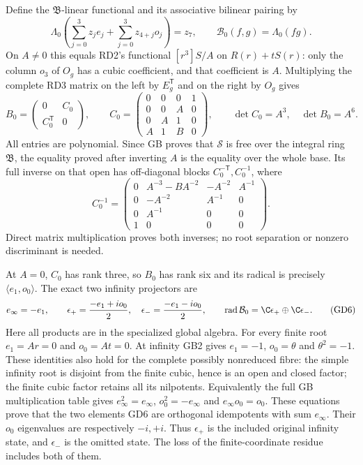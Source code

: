 Define the $\mathfrak B$-linear functional and its associative
bilinear pairing by
\begin{equation}
 \Lambda_0\left(\sum_{j=0}^3z_je_j+\sum_{j=0}^3z_{4+j}o_j\right)=z_7,
 \qquad\mathcal B_0(f,g)=\Lambda_0(fg).
 \tag{GD3}
\end{equation}
On $A\ne0$ this equals RD2's functional
$[r^3]S/A$ on $R(r)+tS(r)$: only the column $o_3$ of
$O_g$ has a cubic coefficient, and that coefficient is $A$.
Multiplying the complete RD3 matrix on the left by $E_g^{\mathsf T}$
and on the right by $O_g$ gives
\begin{equation}
 B_0=\begin{pmatrix}0&C_0\\C_0^{\mathsf T}&0\end{pmatrix},\qquad
 C_0=\begin{pmatrix}0&0&0&1\\0&0&A&0\\0&A&1&0\\A&1&B&0\end{pmatrix},
 \qquad\det C_0=A^3,\quad\det B_0=A^6.
 \tag{GD4}
\end{equation}
All entries are polynomial. Since GB proves that $\mathscr S$
is free over the integral ring $\mathfrak B$, the equality
proved after inverting $A$ is the equality over the whole base.
Its full inverse on that open has off-diagonal blocks
$C_0^{-\mathsf T},C_0^{-1}$, where
\begin{equation}
 C_0^{-1}=\begin{pmatrix}
 0&A^{-3}-BA^{-2}&-A^{-2}&A^{-1}\\
 0&-A^{-2}&A^{-1}&0\\0&A^{-1}&0&0\\1&0&0&0
 \end{pmatrix}.
 \tag{GD5}
\end{equation}
Direct matrix multiplication proves both inverses; no root
separation or nonzero discriminant is needed.

At $A=0$, $C_0$ has rank three, so $B_0$ has rank six and
its radical is precisely $\langle e_1,o_0\rangle$. The exact
two infinity projectors are
\begin{equation}
 e_\infty=-e_1,\qquad
 \epsilon_+=\frac{-e_1+i o_0}{2},\quad
 \epsilon_- =\frac{-e_1-i o_0}{2},\qquad
 \operatorname{rad}\mathcal B_0=\C\epsilon_+\oplus\C\epsilon_-.
 \tag{GD6}
\end{equation}
Here all products are in the specialized global algebra.
For every finite root $e_1=Ar=0$ and $o_0=At=0$.
At infinity GB2 gives $e_1=-1$, $o_0=\theta$ and
$\theta^2=-1$. These identities also hold for the complete
possibly nonreduced fibre: the simple infinity root is
disjoint from the finite cubic, hence is an open and closed
factor; the finite cubic factor retains all its nilpotents.
Equivalently the full GB multiplication table gives
$e_\infty^2=e_\infty$, $o_0^2=-e_\infty$ and
$e_\infty o_0=o_0$. These equations prove that the two
elements GD6 are orthogonal idempotents with sum $e_\infty$.
Their $o_0$ eigenvalues are respectively $-i,+i$.
Thus $\epsilon_+$ is the included original infinity state,
and $\epsilon_-$ is the omitted state. The loss of the
finite-coordinate residue includes both of them.

